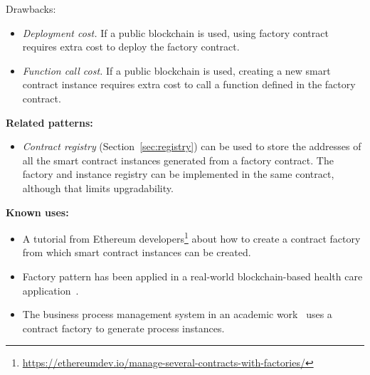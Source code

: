 Drawbacks: 
\begin{itemize}
  \item \textit{Deployment cost.} If a public blockchain is used, using factory contract requires extra cost to deploy the factory contract. 
  \item \textit{Function call cost.} If a public blockchain is used, creating a new smart contract instance requires extra cost to call a function defined in the factory contract. 
\end{itemize}


\vspace{0.5em}\noindent \textbf{Related patterns:}
\begin{itemize}
    \item \textit{Contract registry} (Section~\ref{sec:registry}) can be used to store the addresses of all the smart contract instances generated from a factory contract. The factory and instance registry can be implemented in the same contract, although that limits upgradability.
\end{itemize}


\vspace{0.5em}\noindent \textbf{Known uses:}
\begin{itemize}
  \item A tutorial from Ethereum developers\footnote{\url{https://ethereumdev.io/manage-several-contracts-with-factories/}} about how to create a contract factory from which smart contract instances can be created.
  \item Factory pattern has been applied in a real-world blockchain-based health care application~\cite{factorypattern}.
  \item The business process management system in an academic work~\cite{Weber:BPM2016} uses a contract factory to generate process instances.
\end{itemize}


